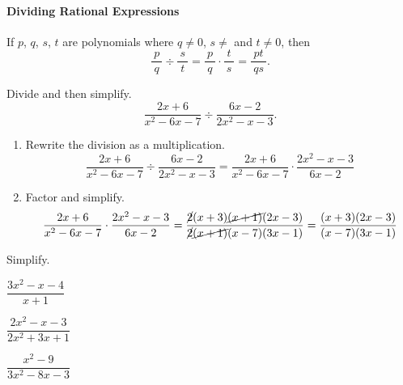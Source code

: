 
\paragraph*{Dividing Rational Expressions}
	If $p$, $q$, $s$, $t$ are polynomials where $q\neq 0$, $s\neq $ and $t\neq 0$, then
	\[
		\dfrac{~p~}{~q~}\div\dfrac{~s~}{~t~}=\dfrac{~p~}{~q~}\cdot\dfrac{~t~}{~s~}=\dfrac{~pt~}{~qs~}.
	\]
	\vspace{-0.75\baselineskip}
	\begin{example}
		Divide and then simplify.
		\[
			\dfrac{2x+6}{x^2-6x-7}\div \dfrac{6x-2}{2x^2-x-3}.
		\]
	\end{example}
	\vspace*{-0.25\baselineskip}
	\begin{solution}\mbox{}
		\begin{enumerate}[label={\textbf{\textup{Step \arabic*.}}~}]
			\item Rewrite the division as a multiplication. %
			      \[
				      \dfrac{2x+6}{x^2-6x-7}\div \dfrac{6x-2}{2x^2-x-3}=\dfrac{2x+6}{x^2-6x-7}\cdot \dfrac{2x^2-x-3}{6x-2}
			      \]
			\item Factor and simplify.
			      \[
					  \dfrac{2x+6}{x^2-6x-7}\cdot\dfrac{2x^2-x-3}{6x-2}
					  =\dfrac{\cancel{2}(x+3)\cancel{(x+1)}(2x-3)}{\cancel{2}\cancel{(x+1)}(x-7)(3x-1)}
					  =\dfrac{(x+3)(2x-3)}{(x-7)(3x-1)}
			      \]
		\end{enumerate}
	\end{solution}


\newpage



\begin{exercise}
	Simplify.\\
	\begin{enumerate*}[label={(\arabic*)~}]
		\item $\dfrac{3x^2-x-4}{x+1}$
		\item $\dfrac{2x^2-x-3}{2x^2+3x+1}$
		\item $\dfrac{x^2-9}{3x^2-8x-3}$
		\hfill\null
	\end{enumerate*}
\end{exercise}

\vfill
\begin{center} \hfill
\end{center}


